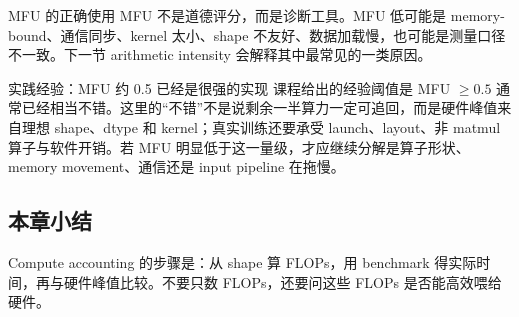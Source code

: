 \begin{importantbox}{MFU 的正确使用}
MFU 不是道德评分，而是诊断工具。MFU 低可能是 memory-bound、通信同步、kernel 太小、shape 不友好、数据加载慢，也可能是测量口径不一致。下一节 arithmetic intensity 会解释其中最常见的一类原因。
\end{importantbox}

\begin{knowledgebox}{实践经验：MFU 约 0.5 已经是很强的实现}
课程给出的经验阈值是 MFU \(\ge 0.5\) 通常已经相当不错。这里的“不错”不是说剩余一半算力一定可追回，而是硬件峰值来自理想 shape、dtype 和 kernel；真实训练还要承受 launch、layout、非 matmul 算子与软件开销。若 MFU 明显低于这一量级，才应继续分解是算子形状、memory movement、通信还是 input pipeline 在拖慢。
\end{knowledgebox}

\subsection{本章小结}

Compute accounting 的步骤是：从 shape 算 FLOPs，用 benchmark 得实际时间，再与硬件峰值比较。不要只数 FLOPs，还要问这些 FLOPs 是否能高效喂给硬件。

